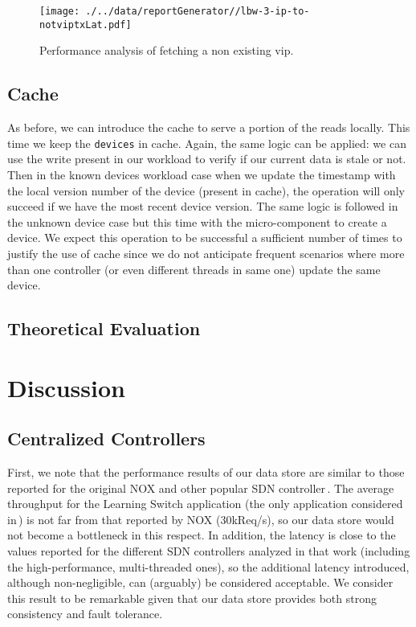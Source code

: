 \begin{figure}[ht]
\centering
\texttt{[image: ./../data/reportGenerator//lbw-3-ip-to-notviptxLat.pdf]}
\caption[Minimum impact of Load Balancer in the pipeline.]{Performance analysis of fetching a non existing \gls{vip}. }\label{fig:lb:minimal}
\end{figure}

\subsection{Cache}
As before, we can introduce the cache to serve a portion of the reads locally. 
This time we keep the \texttt{devices} in cache. 
Again, the same logic  can be applied: we can use the write present in our workload to verify if our current data is stale or not.  Then in the known devices workload case when we update the timestamp with the local version number of the device (present in cache), the operation will only succeed if we have the most recent device version. 
The same logic is followed in the unknown device case but this time with the micro-component to create a device. 
We expect this operation to be successful a sufficient number of times to justify the use of cache since we do not anticipate frequent scenarios where more than one controller (or even different threads in same one) update the same device. 

\subsection{Theoretical Evaluation}


\section{Discussion}

\subsection{Centralized Controllers}
First, we note that the performance results of our data store are similar to those reported for the original NOX and other popular SDN controller\,\cite{Tootoonchian:2012:CPS:2228283.2228297}.
The average throughput for the Learning Switch application (the only application considered in\,\cite{Tootoonchian:2012:CPS:2228283.2228297}) is not far from that reported by NOX (30kReq/s), so our data store would not become a bottleneck in this respect.
In addition, the latency is close to the values reported for the different SDN controllers analyzed in that work (including the high-performance, multi-threaded ones), so the additional latency introduced, although non-negligible, can (arguably) be considered acceptable.
We consider this result to be remarkable given that our data store provides both strong consistency and fault tolerance.

